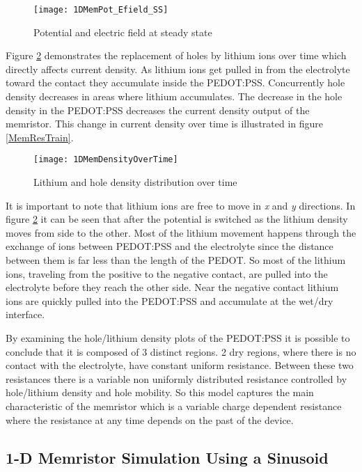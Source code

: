 \begin{doublespace}
\begin{figure}[!htp]
\centering
\texttt{[image: 1DMemPot\_Efield\_SS]}
\caption{Potential and electric field at steady state} 
\label{MemEss}
\end{figure}

Figure \ref{MempLi} demonstrates the replacement of holes by lithium ions over time which directly affects current density.  As lithium ions get pulled in from the electrolyte toward the contact they accumulate inside the PEDOT:PSS. Concurrently hole density decreases in areas where lithium accumulates. The decrease in the hole density in the PEDOT:PSS decreases the current density output of the memristor. This change in current density over time is illustrated in figure \ref{MemResTrain}.

\begin{figure}[!htp]
\centering
\texttt{[image: 1DMemDensityOverTime]}
\caption{Lithium and hole density distribution over time} 
\label{MempLi}
\end{figure}

It is important to note that lithium ions are free to move in \textit{x} and \textit{y} directions. In figure \ref{MempLi} it can be seen that after the potential is switched as the lithium density moves from  side to the other. Most of the lithium movement happens through the exchange of ions between PEDOT:PSS and the electrolyte since the distance between them is far less than the length of the PEDOT. So most of the lithium ions, traveling from the positive to the negative contact, are pulled into the electrolyte before they reach the other side. Near the negative contact lithium ions are quickly pulled into the PEDOT:PSS and accumulate at the wet/dry interface. 

By examining the hole/lithium density plots of the PEDOT:PSS it is possible to conclude that it is composed of 3 distinct regions. 2 dry regions, where there is no contact with the electrolyte, have constant uniform resistance. Between these two resistances there is a variable non uniformly distributed resistance controlled by hole/lithium density and hole mobility. So this model captures the main characteristic of the memristor which is a variable charge dependent resistance where the resistance at any time depends on the past of the device. 

\clearpage
\subsection{1-D Memristor Simulation Using a Sinusoid}


\end{doublespace}
